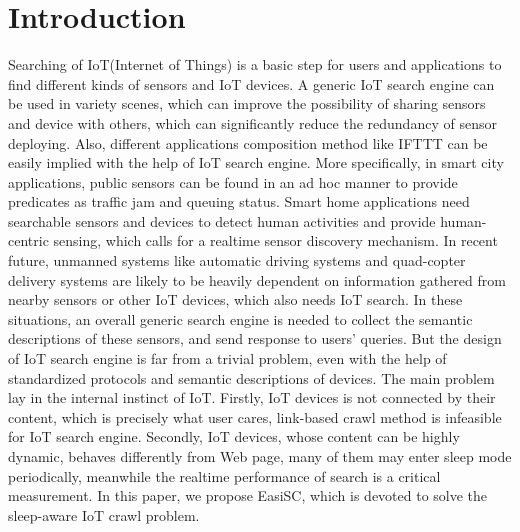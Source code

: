 \documentclass[conference]{IEEEtran}
\begin{document}
\IEEEpeerreviewmaketitle

\section{Introduction}
Searching of IoT(Internet of Things) is a basic step for users and applications to find different kinds of sensors and IoT devices. 
A generic IoT search engine can be used in variety scenes, which can improve the possibility of sharing sensors and device with others, which can significantly reduce the redundancy of sensor deploying. Also, different applications composition method like IFTTT\cite{ifttt} can be easily implied with the help of IoT search engine.
More specifically, in smart city applications, public sensors can be found in an ad hoc manner to provide predicates as traffic jam and queuing status. 
Smart home applications need searchable sensors and devices to detect human activities and provide human-centric sensing, which calls for a realtime sensor discovery mechanism. In recent future, unmanned systems like automatic driving systems and quad-copter delivery systems are likely to be heavily dependent on information gathered from nearby sensors or other IoT devices, which also needs IoT search. In these situations, an overall generic search engine is needed to collect the semantic descriptions of these sensors, and send response to users' queries. 
But the design of IoT search engine is far from a trivial problem, even with the help of standardized protocols and semantic descriptions of devices. The main problem lay in the internal instinct of IoT. Firstly, IoT devices is not connected by their content, which is precisely what user cares, link-based crawl method is infeasible for IoT search engine. Secondly, IoT devices, whose content can be highly dynamic, behaves differently from Web page, many of them may enter sleep mode periodically, meanwhile the realtime performance of search is a critical measurement. In this paper, we propose EasiSC, which is devoted to solve the sleep-aware IoT crawl problem.
\end{document}
